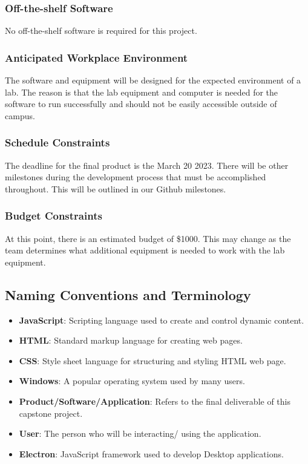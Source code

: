 \documentclass[12pt, titlepage]{article}
\begin{document}
\subsubsection{Off-the-shelf Software}
No off-the-shelf software is required for this project. 

\subsubsection{Anticipated Workplace Environment}
The software and equipment will be designed for the expected environment of a lab. The reason is that the lab equipment and computer is needed for the software to run successfully and
should not be easily accessible outside of campus. 

\subsubsection{Schedule Constraints}
The deadline for the final product is the March 20 2023. There will be other milestones during the development process that must be accomplished throughout. 
This will be outlined in our Github milestones.


\subsubsection{Budget Constraints}
At this point, there is an estimated budget of \$1000. This may change as the team determines what additional equipment is needed to work with the lab equipment.

\subsection{Naming Conventions and Terminology}

\begin{itemize}
    \item \textbf{JavaScript}: Scripting language used to create and control dynamic content.
    \item \textbf{HTML}: Standard markup language for creating web pages.
    \item \textbf{CSS}: Style sheet language for structuring and styling HTML web page.
    \item \textbf{Windows}: A popular operating system used by many users.
    \item \textbf{Product/Software/Application}: Refers to the final deliverable of this capstone project.
    \item \textbf{User}: The person who will be interacting/ using the application.
    \item \textbf{Electron}: JavaScript framework used to develop Desktop applications.  
\end{itemize}
\end{document}

